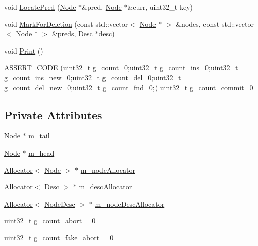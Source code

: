 \begin{DoxyCompactItemize}
\item 
void \hyperlink{classTransList_aeab677f18c6e898efda31cca493c26c1}{Locate\-Pred} (\hyperlink{structTransList_1_1Node}{Node} $\ast$\&pred, \hyperlink{structTransList_1_1Node}{Node} $\ast$\&curr, uint32\-\_\-t key)
\item 
void \hyperlink{classTransList_a13f1abe3e7a04039c8150dd347737cb8}{Mark\-For\-Deletion} (const std\-::vector$<$ \hyperlink{structTransList_1_1Node}{Node} $\ast$ $>$ \&nodes, const std\-::vector$<$ \hyperlink{structTransList_1_1Node}{Node} $\ast$ $>$ \&preds, \hyperlink{structTransList_1_1Desc}{Desc} $\ast$desc)
\item 
void \hyperlink{classTransList_ac929bd3b5510818780364f4bdb9a97c5}{Print} ()
\item 
\hyperlink{classTransList_acb41d121c9576454e04c266e1fd16960}{A\-S\-S\-E\-R\-T\-\_\-\-C\-O\-D\-E} (uint32\-\_\-t g\-\_\-count=0;uint32\-\_\-t g\-\_\-count\-\_\-ins=0;uint32\-\_\-t g\-\_\-count\-\_\-ins\-\_\-new=0;uint32\-\_\-t g\-\_\-count\-\_\-del=0;uint32\-\_\-t g\-\_\-count\-\_\-del\-\_\-new=0;uint32\-\_\-t g\-\_\-count\-\_\-fnd=0;) uint32\-\_\-t \hyperlink{transskip_8cc_a31e805bc19e3448a48adec9322bbb28a}{g\-\_\-count\-\_\-commit}=0
\end{DoxyCompactItemize}
\subsection*{Private Attributes}
\begin{DoxyCompactItemize}
\item 
\hyperlink{structTransList_1_1Node}{Node} $\ast$ \hyperlink{classTransList_a68984196e5b9927e15999d83dd74c8d7}{m\-\_\-tail}
\item 
\hyperlink{structTransList_1_1Node}{Node} $\ast$ \hyperlink{classTransList_ab8ac04fb16a967124ea772639fa0beb4}{m\-\_\-head}
\item 
\hyperlink{classAllocator}{Allocator}$<$ \hyperlink{structTransList_1_1Node}{Node} $>$ $\ast$ \hyperlink{classTransList_acab6fed9ee1f8d04411a384854cc9429}{m\-\_\-node\-Allocator}
\item 
\hyperlink{classAllocator}{Allocator}$<$ \hyperlink{structTransList_1_1Desc}{Desc} $>$ $\ast$ \hyperlink{classTransList_a43e41c095b8a7f6ec6f9eed32db81179}{m\-\_\-desc\-Allocator}
\item 
\hyperlink{classAllocator}{Allocator}$<$ \hyperlink{structTransList_1_1NodeDesc}{Node\-Desc} $>$ $\ast$ \hyperlink{classTransList_ad8a7d0a3827838d2bc7c334502e00b1b}{m\-\_\-node\-Desc\-Allocator}
\item 
uint32\-\_\-t \hyperlink{classTransList_a6ada7d29d449b4f1cd7e6d14c82336af}{g\-\_\-count\-\_\-abort} = 0
\item 
uint32\-\_\-t \hyperlink{classTransList_af98bf3b247f89cca25e17602a343388c}{g\-\_\-count\-\_\-fake\-\_\-abort} = 0
\end{DoxyCompactItemize}



